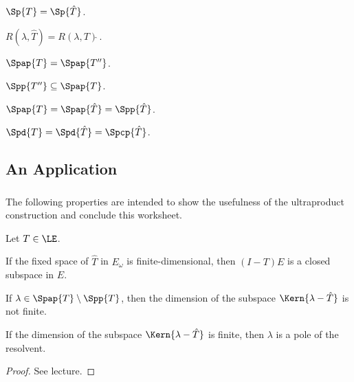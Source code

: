 \documentclass[%
	,english 
	,headings	= small 
	,leqno
	,parskip		= half+
	,DIV			= 14
	,BCOR 			= 10mm	
		]{scrartcl}
\begin{document}
\begin{multicols}{2}
\begin{exercise}
\begin{myenumerate}
	\item
	$ \Sp{ T } = \Sp{ \hat{ T } } $.
	
	\item
	$ R( \lambda , \hat{ T } ) =  R( \lambda , T )\hat{}\, $.
	
	\item
	$ \Spap{ T } = \Spap{ T'' } $.
	
	\item
	$ \Spp{ T'' } \subseteq \Spap{ T } $.
	
	\item
	$ \Spap{ T } = \Spap{ \hat{ T } } = \Spp{ \hat{ T } } $.
	
	\item
	$ \Spd{ T } = \Spd{ \hat{ T } } = \Spcp{ \hat{ T } } $.
	
\end{myenumerate}


\end{exercise}
%
\subsection*{An Application}
\subsubsection{}
The following properties are intended to show the usefulness of the ultraproduct construction and conclude this worksheet.
%
\begin{proposition}
Let $ T \in \LE $.
%
\begin{myenumerate}
	
	\item
	If the fixed space of $ \hat{ T } $ in $ E_{ \omega } $ is finite-dimensional, then $ ( I - T ) E $ is a closed subspace in $ E $.
	
	\item
	If $ \lambda \in \Spap{ T } \setminus \Spp{ T } $, then the dimension of the subspace $ \Kern{ \lambda - \hat{ T } } $ is not finite.
	
	\item
	If the dimension of the subspace $ \Kern{ \lambda - \hat{ T } } $ is finite, then $ \lambda $ is a pole of the resolvent.
\end{myenumerate}
\end{proposition}
\begin{proof}
See lecture.
\end{proof}

%
\printbibliography
\end{multicols}
%
\end{document}
